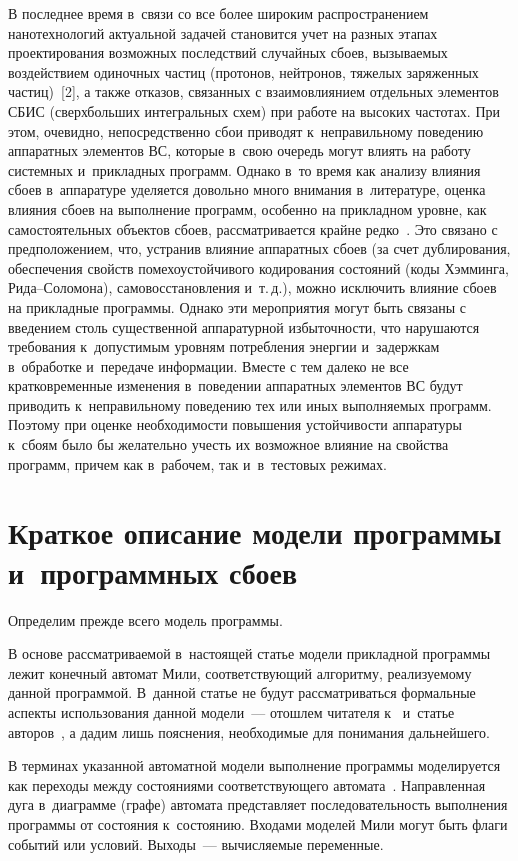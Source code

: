 \begin{multicols}{2}
     В последнее время в~связи со все более широким распространением 
нанотехнологий актуальной задачей становится учет на разных этапах 
проектирования возможных последствий случайных сбоев, вызываемых 
воздействием одиночных частиц (протонов, нейтронов, тяжелых заряженных 
час\-тиц)~[2], а также отказов, связанных с взаимовлиянием отдельных 
элементов СБИС (сверхбольших интегральных схем)
 при работе на высоких частотах. При этом, очевидно, 
непосредственно сбои приводят к~неправильному поведению аппаратных 
элементов ВС, которые в~свою очередь могут влиять на работу системных 
и~прикладных программ. Однако в~то время как анализу влияния сбоев 
в~аппаратуре уделяется довольно много внимания в~литературе, оценка 
влияния сбоев на выполнение программ, особенно на прикладном уровне, как 
самостоятельных объектов сбоев, рассматривается крайне редко~\cite{5-fr}. 
Это связано с предположением, что, устранив влияние аппаратных сбоев (за 
счет дублирования, обеспечения свойств помехоустойчивого кодирования 
состояний (коды Хэмминга, Ри\-да--Со\-ло\-мо\-на), самовосстановления 
и~т.\,д.), можно исключить влияние сбоев на прикладные программы. Однако 
эти мероприятия могут быть связаны с введением столь существенной 
аппаратурной избыточности, что нарушаются требования к~допус\-тимым 
уровням потребления энергии и~задержкам в~обработке и~передаче 
информации. Вместе с тем далеко не все кратковременные изменения 
в~поведении аппаратных элементов ВС будут приводить 
к~неправильному поведению тех или иных выполняемых программ. Поэтому 
при оценке необходимости повышения устойчивости аппаратуры к~сбоям было 
бы желательно учесть их возможное влияние на свойства программ, причем 
как в~рабочем, так и~в~тестовых режимах.
     

\section{Краткое описание модели программы и~программных 
сбоев}

     Определим прежде всего модель программы.
     
     В основе рассматриваемой в~настоящей статье модели прикладной 
программы лежит конечный автомат Мили, соответствующий алгоритму, 
реализуемому данной программой. В~данной статье не будут рассматриваться 
формальные аспекты использования данной модели~--- отошлем читателя 
к~\cite{6-fr} и~статье авторов~\cite{7-fr}, а дадим лишь пояснения, 
необходимые для понимания дальнейшего. 
     
     В терминах указанной автоматной модели выполнение программы 
моделируется как переходы между состояниями соответствующего 
автомата~\cite{6-fr}. Направленная дуга в~диаграмме (графе) автомата 
представляет последовательность выполнения программы от состояния 
к~состоянию. Входами моделей Мили могут быть флаги событий или условий. 
Выходы~--- вычисляемые переменные.
     

\end{multicols}

